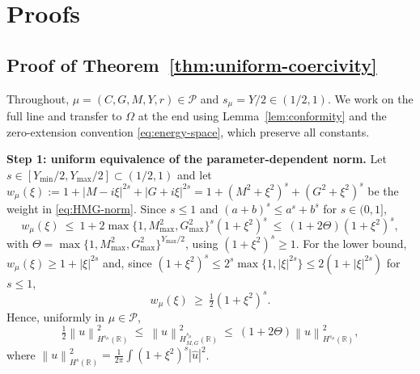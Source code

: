 \documentclass[11pt]{amsart}
\theoremstyle{remark}
\newcommand{\R}{\mathbb{R}}
\newcommand{\Pset}{\mathcal{P}}
\newcommand{\norm}[1]{\left\lVert #1\right\rVert}
\newcommand{\rf}{r}
\begin{document}
\appendix
\section{Proofs}
\label{app:proofs}

\subsection{Proof of Theorem~\ref{thm:uniform-coercivity}}
\label{app:proof-uniform}

Throughout, $\mu=(C,G,M,Y,\rf)\in\Pset$ and $s_\mu=Y/2\in(1/2,1)$.  We work on
the full line and transfer to $\Omega$ at the end using
Lemma~\ref{lem:conformity} and the zero-extension convention
\eqref{eq:energy-space}, which preserve all constants.

\medskip\noindent
\textbf{Step 1: uniform equivalence of the parameter-dependent norm.}
Let $s\in[Y_{\min}/2,Y_{\max}/2]\subset(1/2,1)$ and let
$w_\mu(\xi):=1+|M-i\xi|^{2s}+|G+i\xi|^{2s}
=1+(M^2+\xi^2)^{s}+(G^2+\xi^2)^{s}$ be the weight in
\eqref{eq:HMG-norm}.  Since $s\le1$ and $(a+b)^s\le a^s+b^s$ for $s\in(0,1]$,
\[
  w_\mu(\xi)\ \le\ 1+2\max\{1,M_{\max}^2,G_{\max}^2\}^{s}(1+\xi^2)^{s}
  \ \le\ (1+2\Theta)(1+\xi^2)^{s},
\]
with $\Theta=\max\{1,M_{\max}^2,G_{\max}^2\}^{Y_{\max}/2}$, using
$(1+\xi^2)^s\ge1$.  For the lower bound, $w_\mu(\xi)\ge1+|\xi|^{2s}$ and,
since $(1+\xi^2)^s\le2^s\max\{1,|\xi|^{2s}\}\le2(1+|\xi|^{2s})$ for
$s\le1$,
\[
  w_\mu(\xi)\ \ge\ \tfrac12(1+\xi^2)^{s}.
\]
Hence, uniformly in $\mu\in\Pset$,
\begin{equation}
  \tfrac12\norm{u}_{H^{s_\mu}(\R)}^2
  \ \le\ \norm{u}_{H^{s_\mu}_{M,G}(\R)}^2
  \ \le\ (1+2\Theta)\norm{u}_{H^{s_\mu}(\R)}^2 ,
  \label{eq:uniform-norm-equivalence}
\end{equation}
where $\norm{u}_{H^{s}(\R)}^2=\tfrac1{2\pi}\int(1+\xi^2)^{s}|\widehat u|^2$.
\end{document}
